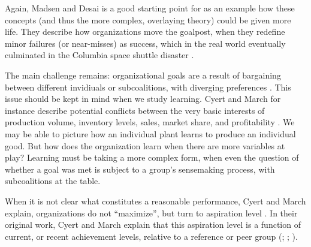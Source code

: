 \documentclass[12pt, man, natbib]{apa6}
\begin{document}
	Again, Madsen and Desai \citet{Madsen2010} is a good starting point for as an example how these concepts (and thus the more complex, overlaying theory) could be given more life. They describe how organizations move the goalpost, when they redefine minor failures (or near-misses) as success, which in the real world eventually culminated in the Columbia space shuttle disaster \citep[p. 457]{Madsen2010}.
	
	The main challenge remains: organizational goals are a result of bargaining between different invidiuals or subcoalitions, with diverging preferences \citep{Cyert1992}. This issue should be kept in mind when we study learning. Cyert and March for instance describe potential conflicts between the very basic interests of production volume, inventory levels, sales, market share, and profitability \citep[pp. 46-49]{Cyert1992}. We may be able to picture how an individual plant learns to produce an individual good. But how does the organization learn when there are more variables at play? Learning must be taking a more complex form, when even the question of whether a goal was met is subject to a group’s sensemaking process, with subcoalitions at the table.
	
	When it is not clear what constitutes a reasonable performance, Cyert and March explain, organizations do not “maximize”, but turn to aspiration level \citep[p. 32]{Cyert1992}. In their original work, Cyert and March explain that this aspiration level is a function of current, or recent achievement levels, relative to a reference or peer group (\citealp[p. 39]{Cyert1992}; \citealp{Greve1998}; \citealp{Baum2007}).



\end{document}
